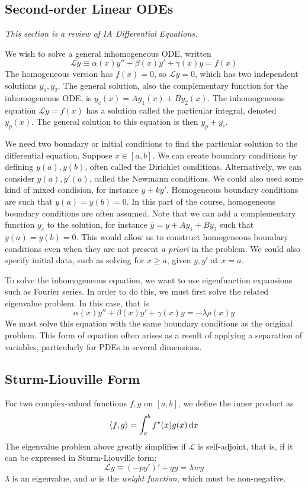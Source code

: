 \subsection{Second-order Linear ODEs}
\textit{This section is a review of IA Differential Equations.}

\noindent We wish to solve a general inhomogeneous ODE, written
\[
	\mathcal L y \equiv \alpha(x) y'' + \beta(x) y' + \gamma(x) y = f(x)
\]
The homogeneous version has \( f(x) = 0 \), so \( \mathcal L y = 0 \), which has two independent solutions \( y_1, y_2 \).
The general solution, also the complementary function for the inhomogeneous ODE, is \( y_c(x) = A y_1(x) + B y_2(x) \).
The inhomogeneous equation \( \mathcal L y = f(x) \) has a solution called the particular integral, denoted \( y_p(x) \).
The general solution to this equation is then \( y_p + y_c \).

We need two boundary or initial conditions to find the particular solution to the differential equation.
Suppose \( x \in [a,b] \).
We can create boundary conditions by defining \( y(a), y(b) \), often called the Dirichlet conditions.
Alternatively, we can consider \( y(a), y'(a) \), called the Newmann conditions.
We could also used some kind of mixed condision, for instance \( y + ky' \).
Homogeneous boundary conditions are such that \( y(a) = y(b) = 0 \).
In this part of the course, homogeneous boundary conditions are often assumed.
Note that we can add a complementary function \( y_c \) to the solution, for instance \( \overline{y} = y + A y_1 + B y_2 \) such that \( \overline{y}(a) = \overline{y}(b) = 0 \).
This would allow us to construct homogeneous boundary conditions even when they are not present \textit{a priori} in the problem.
We could also specify initial data, such as solving for \( x \geq a \), given \( y, y' \) at \( x = a \).

To solve the inhomogeneous equation, we want to use eigenfunction expansions such as Fourier series.
In order to do this, we must first solve the related eigenvalue problem.
In this case, that is
\[
	\alpha(x) y'' + \beta(x) y' + \gamma(x) y = -\lambda \rho(x) y
\]
We must solve this equation with the same boundary conditions as the original problem.
This form of equation often arises as a result of applying a separation of variables, particularly for PDEs in several dimensions.

\subsection{Sturm-Liouville Form}
For two complex-valued functions \( f, g \) on \( [a,b] \), we define the inner product as
\[
	\left\langle{f,g}\right\rangle = \int_a^b f^\star(x) g(x) \dd{x}
\]
The eigenvalue problem above greatly simplifies if \( \mathcal L \) is self-adjoint, that is, if it can be expressed in Sturm-Liouville form:
\[
	\mathcal L y \equiv (-py')' + qy = \lambda w y
\]
\( \lambda \) is an eigenvalue, and \( w \) is the \textit{weight function}, which must be non-negative.

